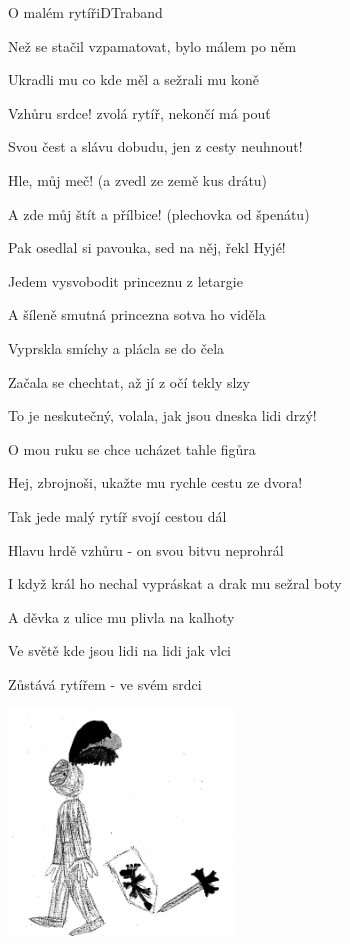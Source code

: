 \begin{song}{O malém rytíři}{D}{Traband}
\begin{SBVerse}
Než se stačil vzpamatovat, bylo málem po něm

Ukradli mu co kde měl a sežrali mu koně

\end{SBVerse}

\begin{SBVerse}

Vzhůru srdce! zvolá rytíř, nekončí má pouť

Svou čest a slávu dobudu, jen z cesty neuhnout!

Hle, můj meč! (a zvedl ze země kus drátu)

A zde můj štít a přílbice! (plechovka od špenátu)

Pak osedlal si pavouka, sed na něj, řekl Hyjé!

Jedem vysvobodit princeznu z letargie

\end{SBVerse}

\begin{SBVerse}

A šíleně smutná princezna sotva ho viděla

Vyprskla smíchy a plácla se do čela

Začala se chechtat, až jí z očí tekly slzy

To je neskutečný, volala, jak jsou dneska lidi drzý!

O mou ruku se chce ucházet tahle figůra

Hej, zbrojnoši, ukažte mu rychle cestu ze dvora!

\end{SBVerse}

\begin{SBVerse}

Tak jede malý rytíř svojí cestou dál

Hlavu hrdě vzhůru - on svou bitvu neprohrál

I když král ho nechal vypráskat a drak mu sežral boty

A děvka z ulice mu plivla na kalhoty

Ve světě kde jsou lidi na lidi jak vlci

Zůstává rytířem - ve svém srdci

\end{SBVerse}
\begin{center}
\includegraphics[width=6cm]{pict/asi-rytíř.jpg}
\end{center}
\end{song}

\pagebreak
